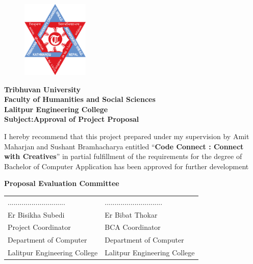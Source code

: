 \documentclass{report}
\begin{document}
\begin{figure}
    \centering
    \includegraphics[width=1.25in]{tu.png}
\end{figure}
\begin{center}
    {\fontsize{14pt}{18}\selectfont
    \textbf{Tribhuvan University\\
    Faculty of Humanities and Social Sciences\\
    Lalitpur Engineering College\\
    \vspace{0.5in}
    Subject:Approval of Project Proposal\\}
    \vspace{0.5in}}
\end{center}
   \justify I hereby recommend that this project prepared under my supervision by Amit Maharjan and Sushant Bramhacharya entitled “\textbf{Code Connect : Connect with Creatives}” in partial fulfillment of the
requirements for the degree of Bachelor of Computer Application has been approved for further development\\
\begin{center}
    {\fontsize{14pt}{18}\selectfont
    \vspace{0.2in}
   \textbf{Proposal Evaluation Committee}\\
    \vspace{0.75in}
    \begin{table}[h]
        \centering
        \begin{tabular}{l l}
           .............................\hspace{2in}  &  .............................\\
           Er Bisikha Subedi&Er Bibat Thokar\\
           Project Coordinator&BCA Coordinator\\
           Department of Computer&Department of Computer\\
           Lalitpur Engineering College &Lalitpur Engineering College

        \end{tabular}
    \end{table}
    
    }
\end{center}
\end{document}
